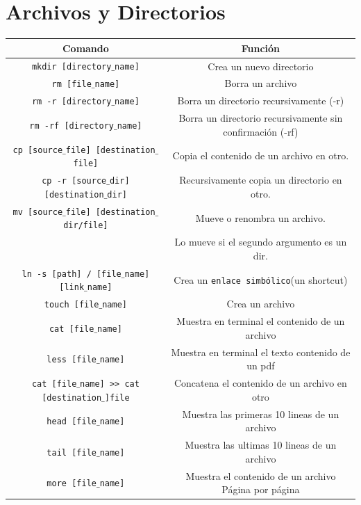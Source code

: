 \documentclass[a4paper,10pt]{article}
\begin{document}
\section*{Archivos y Directorios}
\begin{center}
    \begin{tabular}{| c | c |}
        \hline
        Comando & Función \\
        \hline\hline
        \texttt{mkdir [directory$\_$name]} & Crea un nuevo directorio \\
        \hline
        \texttt{rm [file$\_$name]} & Borra un archivo \\
        \hline
        \texttt{rm -r [directory$\_$name]} & Borra un directorio recursivamente (-r)\\
        \hline
        \texttt{rm -rf [directory$\_$name]} & Borra un directorio recursivamente sin confirmación (-rf) \\
        \hline
        \texttt{cp [source$\_$file] [destination$\_$file]} & Copia el contenido de un archivo en otro. \\
        \hline
        \texttt{cp -r [source$\_$dir] [destination$\_$dir]} & Recursivamente copia un directorio en otro. \\
        \hline
        \texttt{mv [source$\_$file] [destination$\_$dir/file]} & Mueve o renombra un archivo. \\ & Lo mueve si el segundo argumento es un dir. \\
        \hline
        \texttt{ln -s [path] / [file$\_$name] [link$\_$name]} & Crea un \texttt{enlace simbólico}(un shortcut) \\
        \hline
        \texttt{touch [file$\_$name]} & Crea un archivo \\
        \hline
        \texttt{cat [file$\_$name]} & Muestra en terminal el contenido de un archivo \\
        \hline
        \texttt{less [file$\_$name]} & Muestra en terminal el texto contenido de un pdf \\
        \hline
        \texttt{cat [file$\_$name] >> cat [destination$\_$]file} & Concatena el contenido de un archivo en otro \\
        \hline
        \texttt{head [file$\_$name]} & Muestra las primeras 10 lineas de un archivo \\
        \hline
        \texttt{tail [file$\_$name]} & Muestra las ultimas 10 lineas de un archivo \\
        \hline
        \texttt{more [file$\_$name]} & Muestra el contenido de un archivo Página por página \\

\end{tabular}
\end{center}
\end{document}
